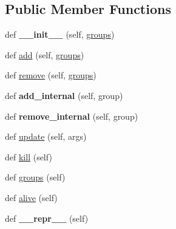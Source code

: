 \subsection*{Public Member Functions}
\begin{DoxyCompactItemize}
\item 
\mbox{\label{classpygame_1_1sprite_1_1_sprite_a0f67e2dcad313276268e8195bb0a1ecc}} 
def {\bfseries \+\_\+\+\_\+init\+\_\+\+\_\+} (self, \hyperlink{classpygame_1_1sprite_1_1_sprite_a737da7fd292c7463b925d512d0cb1ccf}{groups})
\item 
def \hyperlink{classpygame_1_1sprite_1_1_sprite_a9b368933bac409bcd4adfa0c2d18007a}{add} (self, \hyperlink{classpygame_1_1sprite_1_1_sprite_a737da7fd292c7463b925d512d0cb1ccf}{groups})
\item 
def \hyperlink{classpygame_1_1sprite_1_1_sprite_ad13c08925f3ae5869f6ae3c0575b8d34}{remove} (self, \hyperlink{classpygame_1_1sprite_1_1_sprite_a737da7fd292c7463b925d512d0cb1ccf}{groups})
\item 
\mbox{\label{classpygame_1_1sprite_1_1_sprite_ae729842b89af205f095383e84c199698}} 
def {\bfseries add\+\_\+internal} (self, group)
\item 
\mbox{\label{classpygame_1_1sprite_1_1_sprite_a0af07c0acd1128ce271b58b97a1e5d8f}} 
def {\bfseries remove\+\_\+internal} (self, group)
\item 
def \hyperlink{classpygame_1_1sprite_1_1_sprite_adbe463fbe81302ca4f63535eb00e109d}{update} (self, args)
\item 
def \hyperlink{classpygame_1_1sprite_1_1_sprite_adfb628d03641a767b2ade7347568dfe3}{kill} (self)
\item 
def \hyperlink{classpygame_1_1sprite_1_1_sprite_a737da7fd292c7463b925d512d0cb1ccf}{groups} (self)
\item 
def \hyperlink{classpygame_1_1sprite_1_1_sprite_a037be0ccbcd4f4fcefa857ea12fb50f5}{alive} (self)
\item 
\mbox{\label{classpygame_1_1sprite_1_1_sprite_a395ac019eb244edeb02da29815ff5c00}} 
def {\bfseries \+\_\+\+\_\+repr\+\_\+\+\_\+} (self)
\end{DoxyCompactItemize}


